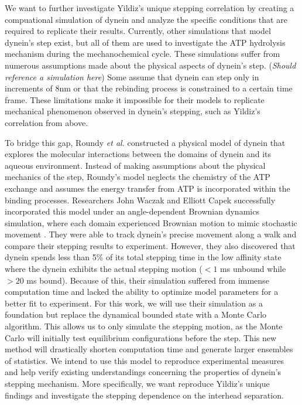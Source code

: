 We want to further investigate Yildiz's unique stepping correlation by creating a compuational simulation of dynein and analyze the specific conditions that are required to replicate their results. Currently, other simulations that model dynein's step exist, but all of them are used to investigate the ATP hydrolysis mechanism during the mechanochemical cycle. These simulations suffer from numerous assumptions made about the physical aspects of dynein's step. (\textit{Should reference a simulation here}) Some assume that dynein can step only in increments of 8nm or that the rebinding process is constrained to a certain time frame. These limitations make it impossible for their models to replicate mechanical phenomenon observed in dynein's stepping, such as Yildiz's correlation from above.

To bridge this gap, Roundy \textit{et al.} constructed a physical model of dynein that explores the molecular interactions between the domains of dynein and its aqueous environment. Instead of making assumptions about the physical mechanics of the step, Roundy's model neglects the chemistry of the ATP exchange and assumes the energy transfer from ATP is incorporated within the binding processes. Researchers John Waczak and Elliott Capek successfully incorporated this model under an angle-dependent Brownian dynamics simulation, where each domain experienced Brownian motion to mimic stochastic movement \cite{Capek2017, }. They were able to track dynein's precise movement along a walk and compare their stepping results to experiment. However, they also discovered that dynein spends less than 5\% of its total stepping time in the low affinity state where the dynein exhibits the actual stepping motion ($<1$ ms unbound while $>20$ ms bound). Because of this, their simulation suffered from immense computation time and lacked the ability to optimize model parameters for a better fit to experiment. For this work, we will use their simulation as a foundation but replace the dynamical bounded state with a Monte Carlo algorithm. This allows us to only simulate the stepping motion, as the Monte Carlo will initially test equilibrium configurations before the step. This new method will drastically shorten computation time and generate larger ensembles of statistics. We intend to use this model to reproduce experimental measures and help verify existing understandings concerning the properties of dynein’s stepping mechanism. More specifically, we want reproduce Yildiz's unique findings and investigate the stepping dependence on the interhead separation. 



